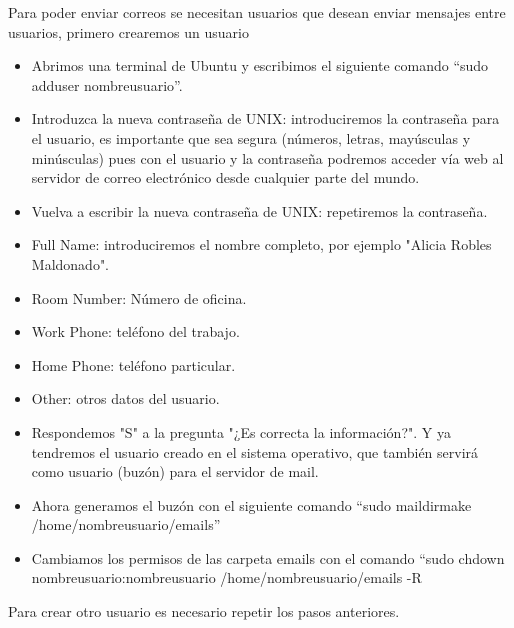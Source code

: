 \documentclass[12pt,oneside,onecolumn,openany]{report}
\begin{document}
Para poder enviar correos se necesitan usuarios que desean enviar mensajes entre usuarios, primero crearemos un usuario
\begin{itemize}
 \item Abrimos una terminal de Ubuntu y escribimos el siguiente comando “sudo adduser nombreusuario”.
 \item Introduzca la nueva contraseña de UNIX: introduciremos la contraseña para el usuario, es importante que sea segura (números, letras, mayúsculas y minúsculas) pues con el usuario y la contraseña podremos acceder vía web al servidor de correo electrónico desde cualquier parte del mundo.
 \item Vuelva a escribir la nueva contraseña de UNIX: repetiremos la contraseña.
 \item Full Name: introduciremos el nombre completo, por ejemplo "Alicia Robles Maldonado".
 \item Room Number: Número de oficina.
 \item Work Phone: teléfono del trabajo.
 \item Home Phone: teléfono particular.
 \item Other: otros datos del usuario.
 \item Respondemos "S" a la pregunta "¿Es correcta la información?". Y ya tendremos el usuario creado en el sistema operativo, que también servirá como usuario (buzón) para el servidor de mail.
 \item Ahora generamos el buzón con el siguiente comando “sudo maildirmake /home/nombreusuario/emails”
 \item Cambiamos los permisos de las carpeta emails con el comando “sudo chdown nombreusuario:nombreusuario /home/nombreusuario/emails -R
\end{itemize}
Para crear otro usuario es necesario repetir los pasos anteriores.
\end{document}
